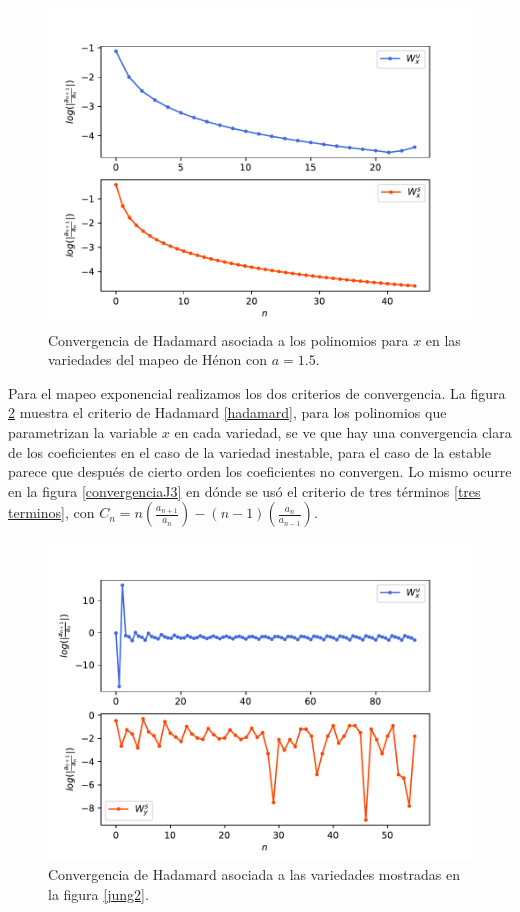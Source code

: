 \begin{figure}[H]
\centering
\includegraphics[scale=0.5]{converHenon1}
\caption{Convergencia de Hadamard asociada a los polinomios para $x$ en las variedades del mapeo de Hénon con $a=1.5$.}
\label{convergenciaHenon1}
\end{figure}


Para el mapeo exponencial realizamos los dos criterios de convergencia. La figura \ref{convergenciaJH} muestra el criterio de Hadamard \eqref{hadamard}, para los polinomios que parametrizan la variable $x$ en cada variedad, se ve que hay una convergencia clara de los coeficientes en el caso de la variedad inestable, para el caso de la estable parece que después de cierto orden los coeficientes no convergen. Lo mismo ocurre en la figura \ref{convergenciaJ3} en dónde se usó el criterio de tres términos \eqref{tres terminos}, con $C_{n}=n\left(\frac{a_{n+1}}{a_{n}}\right)-(n-1)\left(\frac{a_{n}}{a_{n-1}}\right)$.

\begin{figure}[H]
\centering
\includegraphics[scale=0.5]{convergenciaJungH57}
\caption{Convergencia de Hadamard asociada a las variedades mostradas en la figura \ref{jung2}.}
\label{convergenciaJH}
\end{figure}


